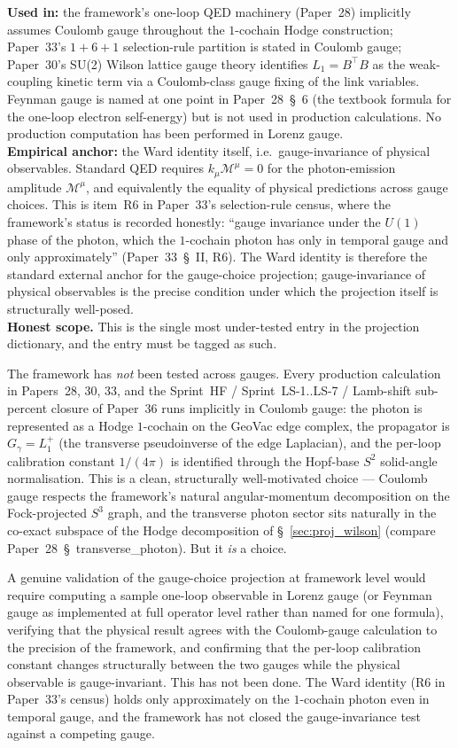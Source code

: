 \textbf{Used in:} the framework's one-loop QED machinery (Paper~28)
implicitly assumes Coulomb gauge throughout the $1$-cochain Hodge
construction; Paper~33's $1{+}6{+}1$ selection-rule partition is
stated in Coulomb gauge; Paper~30's SU(2) Wilson lattice gauge theory
identifies $L_1 = B^\top B$ as the weak-coupling kinetic term via a
Coulomb-class gauge fixing of the link variables.  Feynman gauge is
named at one point in Paper~28~\S~6 (the textbook formula for the
one-loop electron self-energy) but is not used in production
calculations.  No production computation has been performed in Lorenz
gauge.\\
\textbf{Empirical anchor:} the Ward identity itself, i.e.\
gauge-invariance of physical observables.  Standard QED requires
$k_\mu \mathcal{M}^\mu = 0$ for the photon-emission amplitude
$\mathcal{M}^\mu$, and equivalently the equality of physical
predictions across gauge choices.  This is item~R6 in Paper~33's
selection-rule census, where the framework's status is recorded
honestly: ``gauge invariance under the $U(1)$ phase of the photon,
which the $1$-cochain photon has only in temporal gauge and only
approximately'' (Paper~33~\S~II, R6).  The Ward identity is therefore
the standard external anchor for the gauge-choice projection;
gauge-invariance of physical observables is the precise condition
under which the projection itself is structurally well-posed.\\
\textbf{Honest scope.}  This is the single most under-tested entry in
the projection dictionary, and the entry must be tagged as such.

The framework has \emph{not} been tested across gauges.  Every
production calculation in Papers~28, 30, 33, and the Sprint~HF /
Sprint~LS-1..LS-7 / Lamb-shift sub-percent closure of Paper~36 runs
implicitly in Coulomb gauge: the photon is represented as a Hodge
$1$-cochain on the GeoVac edge complex, the propagator is
$G_\gamma = L_1^+$ (the transverse pseudoinverse of the edge
Laplacian), and the per-loop calibration constant $1/(4\pi)$ is
identified through the Hopf-base $S^2$ solid-angle normalisation.
This is a clean, structurally well-motivated choice ---  Coulomb gauge
respects the framework's natural angular-momentum decomposition on
the Fock-projected $S^3$ graph, and the transverse photon sector
sits naturally in the co-exact subspace of the Hodge decomposition
of \S~\ref{sec:proj_wilson} (compare Paper~28~\S~transverse\_photon).
But it \emph{is} a choice.

A genuine validation of the gauge-choice projection at framework level
would require computing a sample one-loop observable in Lorenz gauge
(or Feynman gauge as implemented at full operator level rather than
named for one formula), verifying that the physical result agrees
with the Coulomb-gauge calculation to the precision of the framework,
and confirming that the per-loop calibration constant changes
structurally between the two gauges while the physical observable is
gauge-invariant.  This has not been done.  The Ward identity (R6 in
Paper~33's census) holds only approximately on the $1$-cochain photon
even in temporal gauge, and the framework has not closed the
gauge-invariance test against a competing gauge.

